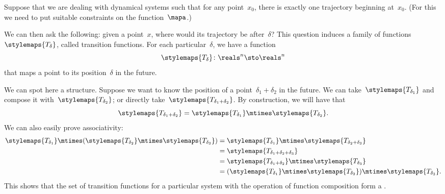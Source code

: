 
Suppose that we are dealing with dynamical systems such that for any point~$x_0$, there is exactly one trajectory beginning at~$x_0$.
(For this we need to put suitable constraints on the function~$\mapa$.)

We can then ask the following: given a point~$x$, where would its trajectory be after~$\delta$?
This question induces a family of functions~$\stylemaps{T_\delta}$, called transition functions.
For each particular~$\delta$, we have a function
\begin{equation}
    \stylemaps{T_{\delta}}\colon \reals^n \sto \reals^n
\end{equation}
that maps a point to its position~$\delta$ in the future.

We can spot here a  structure.
Suppose we want to know the position of a point~$\delta_1 + \delta_2$
in the future.
We can take~$\stylemaps{T_{\delta_1}}$ and compose it with~$\stylemaps{T_{\delta_2}}$; or directly take~$\stylemaps{T_{\delta_1 + \delta_2}}$.
By construction, we will have that
\begin{equation}
    \label{eq:transition-property}
    \stylemaps{T_{\delta_1 + \delta_2}} = \stylemaps{T_{\delta_1}} \mtimes \stylemaps{T_{\delta_2}}.
\end{equation}
We can also easily prove associativity:
\begin{equation}
    \begin{aligned}
        \stylemaps{T_{\delta_1}}\mtimes (\stylemaps{T_{\delta_2}}\mtimes \stylemaps{T_{\delta_3}}) & =\stylemaps{T_{\delta_1}}\mtimes \stylemaps{T_{\delta_2+\delta_3}} \\
                                                                                                   & =\stylemaps{T_{\delta_1+\delta_2+\delta_3}} \\
                                                                                                   & =\stylemaps{T_{\delta_1+\delta_2}}\mtimes \stylemaps{T_{\delta_3}} \\
                                                                                                   & =(\stylemaps{T_{\delta_1}}\mtimes \stylemaps{T_{\delta_2}})\mtimes \stylemaps{T_{\delta_3}}.
    \end{aligned}
\end{equation}
%
This shows that the set of transition functions for a particular system with the operation of function composition form a .

